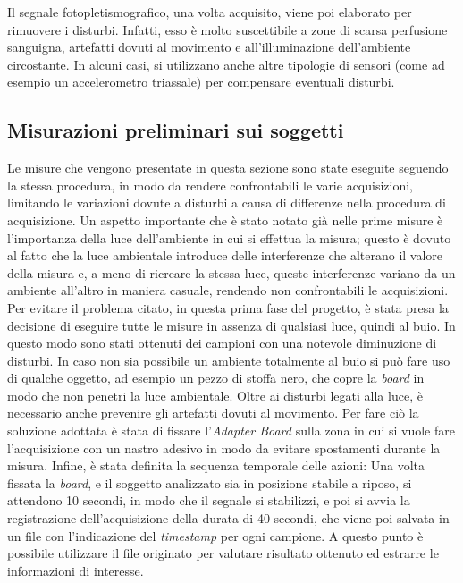 Il segnale fotopletismografico, una volta acquisito, viene poi elaborato per rimuovere i disturbi. Infatti, esso è molto suscettibile a zone di scarsa perfusione sanguigna, artefatti dovuti al movimento e all'illuminazione dell'ambiente circostante. In alcuni casi, si utilizzano anche altre tipologie di sensori (come ad esempio un accelerometro triassale) per compensare eventuali disturbi.

\subsection{Misurazioni preliminari sui soggetti}\label{cap:misure_preliminari}
Le misure che vengono presentate in questa sezione sono state eseguite seguendo la stessa procedura, in modo da rendere confrontabili le varie acquisizioni, limitando le variazioni dovute a disturbi a causa di differenze nella procedura di acquisizione. Un aspetto importante che è stato notato già nelle prime misure è l'importanza della luce dell'ambiente in cui si effettua la misura; questo è dovuto al fatto che la luce ambientale introduce delle interferenze che alterano il valore della misura e, a meno di ricreare la stessa luce, queste interferenze variano da un ambiente all'altro in maniera casuale, rendendo non confrontabili le acquisizioni. Per evitare il problema citato, in questa prima fase del progetto, è stata presa la decisione di eseguire tutte le misure in assenza di qualsiasi luce, quindi al buio. In questo modo sono stati ottenuti dei campioni con una notevole diminuzione di disturbi. In caso non sia possibile un ambiente totalmente al buio si può fare uso di qualche oggetto, ad esempio un pezzo di stoffa nero, che copre la \textit{board} in modo che non penetri la luce ambientale.
Oltre ai disturbi legati alla luce, è necessario anche prevenire gli artefatti dovuti al movimento. Per fare ciò la soluzione adottata è stata di fissare l'\textit{Adapter Board} sulla zona in cui si vuole fare l'acquisizione con un nastro adesivo in modo da evitare spostamenti durante la misura.
Infine, è stata definita la sequenza temporale delle azioni: Una volta fissata la \textit{board}, e il soggetto analizzato sia in posizione stabile a riposo, si attendono 10 secondi, in modo che il segnale si stabilizzi, e poi si avvia la registrazione dell'acquisizione della durata di 40 secondi, che viene poi salvata in un file con l'indicazione del \textit{timestamp} per ogni campione. A questo punto è possibile utilizzare il file originato per valutare risultato ottenuto ed estrarre le informazioni di interesse.

